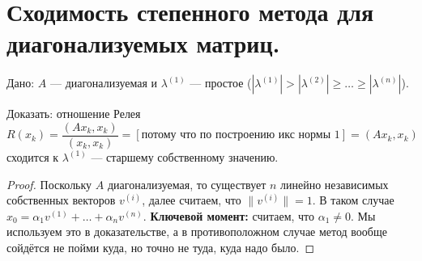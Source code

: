 \section{Сходимость степенного метода для диагонализуемых матриц.}

Дано: $A$ --- диагонализуемая и $\lambda^{(1)}$ --- простое ($|\lambda^{(1)}| >
    |\lambda^{(2)}| \geq \dots \geq |\lambda^{(n)}|$).

Доказать: отношение Релея $R(x_k) = \dfrac{(A x_k, x_k)}{(x_k, x_k)}
    = [\text{потому что по построению икс нормы 1}] = (A x_k, x_k)$ сходится к $\lambda^{(1)}$ --- старшему собственному значению.

\begin{proof}
    Поскольку $A$ диагонализуемая, то существует $n$ линейно независимых собственных
    векторов $v^{(i)}$, далее считаем, что $\|v^{(i)}\| = 1$.
    В таком случае $x_0 = \alpha_1 v^{(1)} + \dots +
        \alpha_n v^{(n)}$. \textbf{Ключевой момент:} считаем, что $\alpha_1 \neq 0$. Мы используем
    это в доказательстве, а в противоположном случае метод вообще сойдётся не пойми
    куда, но точно не туда, куда надо было.


\end{proof}
